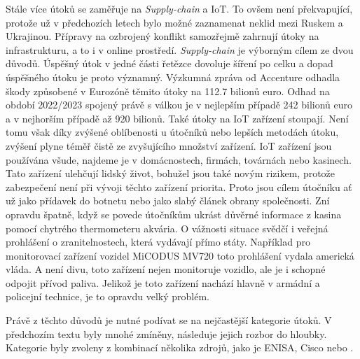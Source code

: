 Stále více útoků se zaměřuje na \textit{Supply-chain} a \ac{IoT}.
To ovšem není překvapující, protože už v předchozích letech bylo možné zaznamenat neklid mezi Ruskem a Ukrajinou.
Přípravy na ozbrojený konflikt samozřejmě zahrnují útoky na infrastrukturu, a to i v online prostředí.
\textit{Supply-chain} je výborným cílem ze dvou důvodů.
Úspěšný útok v jedné části řetězce dovoluje šíření po celku a dopad úspěšného útoku je proto významný.
Výzkumná zpráva od Accenture\cite{accenture_supply-chain-disruption} odhadla škody způsobené v Eurozóně těmito útoky na 112.7 bilionů euro.
Odhad na období 2022/2023 spojený právě s válkou je v nejlepším případě 242 bilionů euro a v nejhorším případě až 920 bilionů.
Také útoky na \ac{IoT} zařízení stoupají.
Není tomu však díky zvýšené oblíbenosti u útočníků nebo lepších metodách útoku, zvýšení plyne téměř čistě ze zvyšujícího množství zařízení.
\ac{IoT} zařízení jsou používána všude, najdeme je v domácnostech, firmách, továrnách nebo kasinech.
Tato zařízení ulehčují lidský život, bohužel jsou také novým rizikem, protože zabezpečení není při vývoji těchto zařízení priorita.
Proto jsou cílem útočníku ať už jako přídavek do botnetu nebo jako slabý článek obrany společnosti.
Zní opravdu špatně, když se povede útočníkům ukrást důvěrné informace z kasina pomocí chytrého thermometeru akvária\cite{casino_thermometer}.
O vážnosti situace svědčí i veřejná prohlášení o zranitelnostech, která vydávají přímo státy.
Například pro monitorovací zařízení vozidel MiCODUS MV720 toto prohlášení vydala americká vláda\cite{america_gov_advisories_micodus}.
A není divu, toto zařízení nejen monitoruje vozidlo, ale je i schopné odpojit přívod paliva.
Jelikož je toto zařízení nachází hlavně v armádní a policejní technice, je to opravdu velký problém.\cite{securityintelligence_most_common_2022_attacks}

Právě z těchto důvodů je nutné podívat se na nejčastější kategorie útoků.
V předchozím textu byly mnohé zmíněny, následuje jejich rozbor do hloubky.
Kategorie byly zvoleny z kombinací několika zdrojů, jako je \ac{ENISA}\cite{Enisa_thread_landscape}, Cisco\cite{cisco_most_common_attack} nebo \cite{nist_risks}.

